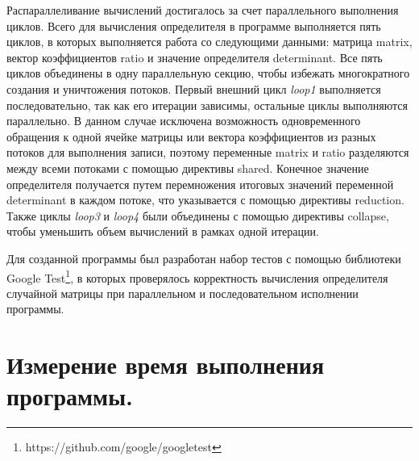 \documentclass[a4paper,14pt]{extarticle}
\begin{document}
    Распараллеливание вычислений достигалось за счет параллельного выполнения циклов.
    Всего для вычисления определителя в программе выполняется пять циклов,
    в которых выполняется работа со следующими данными: матрица matrix,
    вектор коэффициентов ratio и значение определителя determinant.
    Все пять циклов объединены в одну параллельную секцию, чтобы избежать многократного создания и уничтожения потоков.
    Первый внешний цикл \textit{loop1} выполняется последовательно, так как его итерации зависимы,
    остальные циклы выполняются параллельно.
    В данном случае исключена возможность одновременного обращения к одной ячейке матрицы или вектора коэффициентов из
    разных потоков для выполнения записи, поэтому переменные matrix и ratio разделяются между всеми потоками с помощью
    директивы shared.
    Конечное значение определителя получается путем перемножения итоговых значений переменной determinant в каждом потоке,
    что указывается с помощью директивы reduction.
    Также циклы \textit{loop3} и \textit{loop4} были объединены с помощью директивы collapse,
    чтобы уменьшить объем вычислений в рамках одной итерации.

    Для созданной программы был разработан набор тестов с помощью библиотеки
    Google Test\footnote{https://github.com/google/googletest}, в которых проверялось
    корректность вычисления определителя случайной матрицы при параллельном и последовательном исполнении программы.

    \section{Измерение время выполнения программы.}
\end{document}
